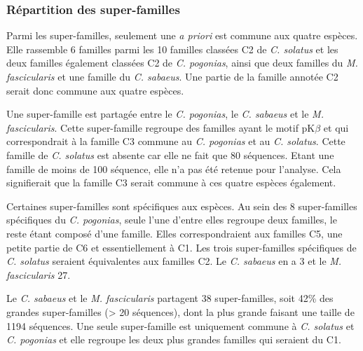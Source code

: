 \documentclass[12pt,a4paper]{article}
\begin{document}
	\subsubsection{Répartition des super-familles}
	Parmi les super-familles, seulement une \textit{a priori} est commune aux quatre espèces. Elle rassemble 6 familles parmi les 10 familles classées C2 de \textit{C. solatus} et les deux familles également classées C2 de \textit{C. pogonias}, ainsi que deux familles du \textit{M. fascicularis} et une famille du \textit{C. sabaeus}. Une partie de la famille annotée C2 serait donc commune aux quatre espèces.
	
	Une super-famille est partagée entre le \textit{C. pogonias}, le \textit{C. sabaeus} et le \textit{M. fascicularis}. Cette super-famille regroupe des familles ayant le motif pK$\beta$ et qui correspondrait à la famille C3 commune au \textit{C. pogonias} et au \textit{C. solatus}. Cette famille de \textit{C. solatus} est absente car elle ne fait que 80 séquences. Etant une famille de moins de 100 séquence, elle n'a pas été retenue pour l'analyse. Cela signifierait que la famille C3 serait commune à ces quatre espèces également.
	
	Certaines super-familles sont spécifiques aux espèces. Au sein des 8 super-familles spécifiques du \textit{C. pogonias}, seule l'une d'entre elles regroupe deux familles, le reste étant composé d'une famille. Elles correspondraient aux familles C5, une petite partie de C6 et essentiellement à C1. Les trois super-familles spécifiques de \textit{C. solatus} seraient équivalentes aux familles C2. Le \textit{C. sabaeus} en a 3 et le \textit{M. fascicularis} 27.
	
	Le \textit{C. sabaeus} et le \textit{M. fascicularis} partagent 38 super-familles, soit 42\% des grandes super-familles (> 20 séquences), dont la plus grande faisant une taille de 1194 séquences. Une seule super-famille est uniquement commune à \textit{C. solatus} et \textit{C. pogonias} et elle regroupe les deux plus grandes familles qui seraient du C1.
	
\end{document}
